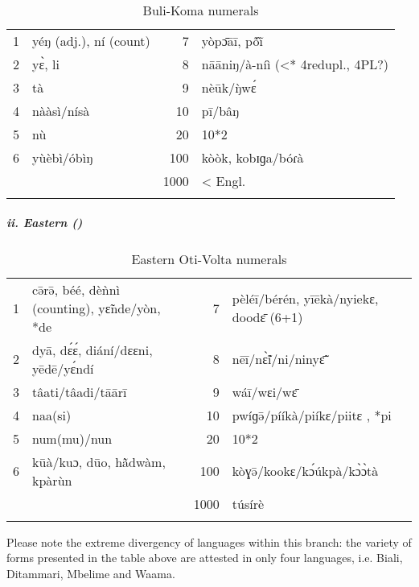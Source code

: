 \begin{table}
\caption{\label{tab:3:166}Buli-Koma numerals}


\begin{tabularx}{\textwidth}{lXrX}
\lsptoprule

{1} & yéŋ (adj.), ní (count) & {7} & yòp{\={ɔ}}{\={a}}{\={i}}, p{\'{\~o}}{\`ĩ}\\
{2} & y{\`{ɛ}}, li & {8} & n{\={a}}{\={a}}niŋ/à-níì (<* 4redupl., 4PL?)\\
{3} & tà & {9} & nè{\={u}}k/{\`{ŋ}}w{\'{ɛ}}\\
{4} & nààsì/nísà & {10} & p{\={i}}/b{\^{a}}ŋ\\
{5} & n{\`{u}} & {20} & 10*2\\
{6} & y{\`{u}}èbì/óbìŋ & {100} & kòòk, kobɪɡa/bóɾà\\
&  & {1000} & < Engl.\\
\lspbottomrule
\end{tabularx}
\end{table}

  
\subparagraph{ii. Eastern ()}

\begin{table}
\caption{\label{tab:3:167}Eastern Oti-Volta numerals}


\begin{tabularx}{\textwidth}{lQrQ}
\lsptoprule

{1} & c{\={ə}}r{\={ə}}, béé, dè{\`{n}}nì (counting), y{\~{ɛ}}nde/yòn, *de & {7} & pèlé{\={i}}/bérén, y{\={i}}{\={e}}kà/nyiekɛ, dood{\={ɛ}} (6+1)\\
{2} & dy{\={a}}, d{\'{ɛ}}{\'{ɛ}}, diání/dɛɛni, y{\={e}}d{\={e}}/y{\'{ɛ}}ndí & {8} & n{\={e}}{\={i}}/n{\`{\~ɛ}}í/ni/niny{\={\~{ɛ}}}\\
{3} & t{\^{a}}ati/t{\^{a}}adi/t{\={a}}{\={a}}r{\={i}} & {9} & wá{\={i}}/wɛi/w{\={ɛ}}\\
{4} & naa(si) & {10} & pwíɡ{\={ə}}/pííkà/piíkɛ/piitɛ , *pi\\
{5} & num(mu)/nun & {20} & 10*2\\
{6} & k{\={u}}à/kuɔ, d{\={u}}o, h{\`{\~a}}dwàm, kpàr{\`{u}}n & {100} & kòɣ{\={ə}}/kookɛ/k{\'{ɔ}}{\'{u}}kpà/k{\`{ɔ}}{\`{ɔ}}tà\\
&  & {1000} & t{\'{u}}sírè\\
\lspbottomrule
\end{tabularx}
\end{table}

Please note the extreme divergency of languages within this branch: the variety of forms presented in the table above are attested in only four languages, i.e. Biali, Ditammari, Mbelime and Waama.


